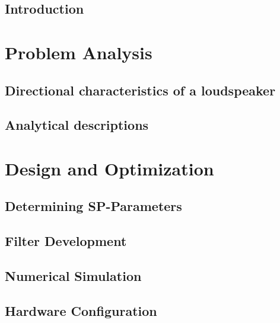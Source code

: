 \glsresetall
 \graphicspath{{figures/analysing/}}
\chapter{Introduction}\label{ch:intro}

\part{Problem Analysis}\label{pt:analysis} \glsresetall
 \graphicspath{{figures/analysing/}}
	\chapter{Directional characteristics of a loudspeaker}\label{ch:directional}
		
		
	\chapter{Analytical descriptions}\label{ch:analytical}
		
		
		
		

	



\part{Design and Optimization}\label{pt:design} 
\graphicspath{{figures/design/}}	
\chapter{Determining SP-Parameters}\label{ch:optimization}
	 		
\chapter{Filter Development}
	
\chapter{Numerical Simulation}\label{ch:numerical} 
	  
	 
\chapter{Hardware Configuration}
	 

